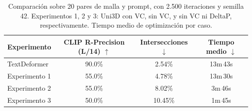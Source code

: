 \begin{table}[ht]
    \centering
    \renewcommand{\arraystretch}{1.15}
    \setlength{\tabcolsep}{8pt}
    \begin{tabular}{lccc}
        \toprule
        Experimento & CLIP R-Precision (L/14) $\uparrow$
        & Intersecciones $\downarrow$ & Tiempo medio $\downarrow$ \\
        \midrule
        TextDeformer  & 90.0\% & 2.54\%  & 13m\,43s \\
        Experimento 1 & 55.0\% & 4.78\%  & 13m\,30s \\
        Experimento 2 & 55.0\% & 8.02\%  & 3m\,46s \\
        Experimento 3 & 50.0\% & 10.45\% & 1m\,45s \\
        \bottomrule
    \end{tabular}
    \caption{Comparaci\'on sobre 20 pares de malla y prompt, con 2.500
    iteraciones y semilla 42. Experimentos 1, 2 y 3: Uni3D con VC,
    sin VC, y sin VC ni DeltaP, respectivamente. Tiempo medio de
    optimizaci\'on por caso.}
    \label{tab:unitextdeformer-results}
\end{table}
